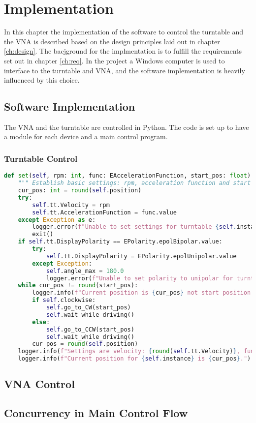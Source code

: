 \chapter{Implementation} \label{ch:implementation}
In this chapter the implementation of the software to control the turntable and the VNA is described based on the design principles laid out in chapter \ref{ch:design}. The bacjground for the implmentation is to fulfill the requirements set out in chapter \ref{ch:req}. In the project a Windows computer is used to interface to the turntable and VNA, and the software implementation is heavily influenced by this choice.

\section{Software Implementation}
The VNA and the turntable are controlled in Python. The code is set up to have a module for each device and a main control program.

\subsection{Turntable Control}

\begin{lstlisting}[language=Python, caption=Python example]
    def set(self, rpm: int, func: EAccelerationFunction, start_pos: float) -> None:
    """ Establish basic settings: rpm, acceleration function and start position. """
    cur_pos: int = round(self.position)
    try:
        self.tt.Velocity = rpm
        self.tt.AccelerationFunction = func.value
    except Exception as e:
        logger.error(f"Unable to set settings for turntable {self.instance}, exiting with error code {e}.")
        exit()
    if self.tt.DisplayPolarity == EPolarity.epolBipolar.value:
        try:
            self.tt.DisplayPolarity = EPolarity.epolUnipolar.value
        except Exception:
            self.angle_max = 180.0
            logger.error(f"Unable to set polarity to unipolar for turntable {self.instance}.")
    while cur_pos != round(start_pos):
        logger.info(f"Current position is {cur_pos} not start position {round(start_pos)}. Moving {self.instance} to start position.")
        if self.clockwise:
            self.go_to_CW(start_pos)
            self.wait_while_driving()
        else:
            self.go_to_CCW(start_pos)
            self.wait_while_driving()
        cur_pos = round(self.position)
    logger.info(f"Settings are velocity: {round(self.tt.Velocity)}, function: {EAccelerationFunction(self.tt.AccelerationFunction)}.")
    logger.info(f"Current position for {self.instance} is {cur_pos}.")
\end{lstlisting}

\section{VNA Control}


\section{Concurrency in Main Control Flow}
